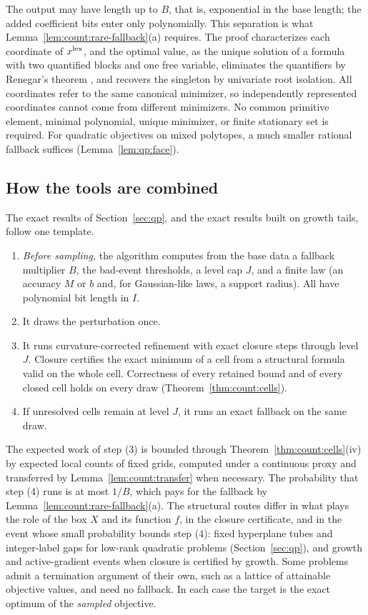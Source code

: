 The output may have length up to $B$, that is, exponential in the base
length; the added coefficient bits enter only polynomially. This separation
is what Lemma~\ref{lem:count:rare-fallback}(a) requires. The proof
characterizes each coordinate of $x^{\rm lex}$, and the optimal value, as the
unique solution of a formula with two quantified blocks and one free
variable, eliminates the quantifiers by Renegar's theorem
\cite{renegar1992-on-the-computational-complexity-and}, and recovers the
singleton by univariate root isolation. All coordinates refer to the same
canonical minimizer, so independently represented coordinates cannot come
from different minimizers. No common primitive element, minimal polynomial,
unique minimizer, or finite stationary set is required. For quadratic
objectives on mixed polytopes, a much smaller rational fallback suffices
(Lemma~\ref{lem:qp:face}).

\subsection{How the tools are combined}\label{sec:count:template}

The exact results of Section~\ref{sec:qp}, and the exact results built on
growth tails, follow one template.
\begin{enumerate}[label=(\arabic*)]
\item \emph{Before sampling,} the algorithm computes from the base data a
 fallback multiplier $B$, the bad-event thresholds, a level cap $J$, and a
 finite law (an accuracy $M$ or $b$ and, for Gaussian-like laws, a support
 radius). All have polynomial bit length in $I$.
\item It draws the perturbation once.
\item It runs curvature-corrected refinement with exact closure steps through
 level $J$. Closure certifies the exact minimum of a cell from a structural
 formula valid on the whole cell. Correctness of every retained bound and of
 every closed cell holds on every draw (Theorem~\ref{thm:count:cells}).
\item If unresolved cells remain at level $J$, it runs an exact fallback on
 the same draw.
\end{enumerate}
The expected work of step (3) is bounded through
Theorem~\ref{thm:count:cells}(iv) by expected local counts of fixed grids,
computed under a continuous proxy and transferred by
Lemma~\ref{lem:count:transfer} when necessary. The probability that step
(4) runs is at most $1/B$, which pays for the fallback by
Lemma~\ref{lem:count:rare-fallback}(a). The structural routes differ in what
plays the role of the box $X$ and its function $f$, in the closure
certificate, and in the event whose small probability bounds step (4):
fixed hyperplane tubes and integer-label gaps for low-rank quadratic
problems (Section~\ref{sec:qp}), and growth and active-gradient events when
closure is certified by growth. Some problems admit a termination argument
of their own, such as a lattice of attainable objective values, and need no
fallback. In each case the target is the exact optimum of the
\emph{sampled} objective.

